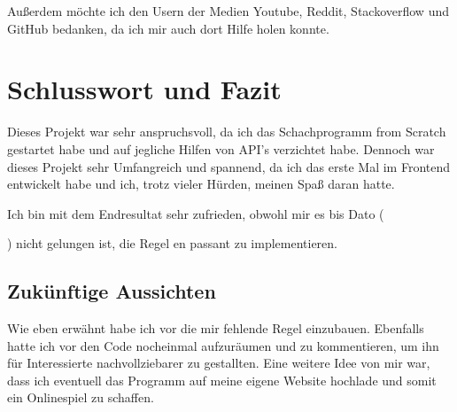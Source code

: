 \documentclass[a4paper, 10pt]{scrartcl}
\begin{document}
Außerdem möchte ich den Usern der Medien Youtube, Reddit, Stackoverflow und GitHub bedanken,
da ich mir auch dort Hilfe holen konnte. 

\section{Schlusswort und Fazit}
Dieses Projekt war sehr anspruchsvoll, da ich das Schachprogramm \glqq from Scratch\grqq{}
gestartet habe und auf jegliche Hilfen von API's verzichtet habe. Dennoch war dieses Projekt
sehr Umfangreich und spannend, da ich das erste Mal im Frontend entwickelt habe und ich,
trotz vieler Hürden, meinen Spaß daran hatte. 

Ich bin mit dem Endresultat sehr zufrieden, obwohl mir es bis Dato  (\date{}) 
nicht gelungen ist, die Regel \glqq en passant \grqq{} zu implementieren.

\subsection{Zukünftige Aussichten}
Wie eben erwähnt habe ich vor die mir fehlende Regel einzubauen. Ebenfalls hatte ich vor
den Code nocheinmal aufzuräumen und zu kommentieren, um ihn für Interessierte nachvollziebarer
zu gestallten. 
Eine weitere Idee von mir war, dass ich eventuell das Programm auf meine eigene Website
hochlade und somit ein Onlinespiel zu schaffen.
\end{document}

